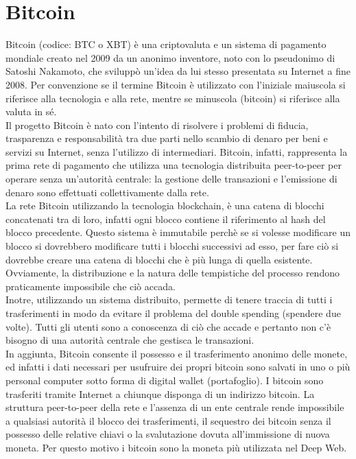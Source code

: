 \section{Bitcoin}
\label{sec:bitcoin}
Bitcoin (codice: BTC o XBT) è una criptovaluta e un sistema di pagamento mondiale creato nel 2009 da un anonimo inventore, noto con lo pseudonimo di Satoshi Nakamoto, che sviluppò un'idea da lui stesso presentata su Internet a fine 2008. Per convenzione se il termine Bitcoin è utilizzato con l'iniziale maiuscola si riferisce alla tecnologia e alla rete, mentre se minuscola (bitcoin) si riferisce alla valuta in sé.\cite{bitcoin:ECDSA}
\\Il progetto Bitcoin è nato con l'intento di risolvere i problemi di fiducia, trasparenza e responsabilità tra due parti nello scambio di denaro per beni e servizi su Internet, senza l'utilizzo di intermediari. Bitcoin, infatti, rappresenta la prima rete di pagamento che utilizza una tecnologia distribuita peer-to-peer per operare senza un'autorità centrale: la gestione delle transazioni e l'emissione di denaro sono effettuati collettivamente dalla rete.
\\La rete Bitcoin utilizzando la tecnologia blockchain, è una catena di blocchi concatenati tra di loro, infatti ogni blocco contiene il riferimento al hash del blocco precedente. Questo sistema è immutabile perchè se si volesse modificare un blocco si dovrebbero modificare tutti i blocchi successivi ad esso, per fare ciò si dovrebbe creare una catena di blocchi che è più lunga di quella esistente. Ovviamente, la distribuzione e la natura delle tempistiche del processo rendono praticamente impossibile che ciò accada.
\\Inotre, utilizzando un sistema distribuito, permette di tenere traccia di tutti i trasferimenti in modo da evitare il problema del double spending (spendere due volte). Tutti gli utenti sono a conoscenza di ciò che accade e pertanto non c’è bisogno di una autorità centrale che gestisca le transazioni.
\\In aggiunta, Bitcoin consente il possesso e il trasferimento anonimo delle monete, ed infatti i dati necessari per usufruire dei propri bitcoin sono salvati in uno o più personal computer sotto forma di digital wallet (portafoglio). I bitcoin sono trasferiti tramite Internet a chiunque disponga di un indirizzo bitcoin. La struttura peer-to-peer della rete e l'assenza di un ente centrale rende impossibile a qualsiasi autorità il blocco dei trasferimenti, il sequestro dei bitcoin senza il possesso delle relative chiavi o la svalutazione dovuta all'immissione di nuova moneta. Per questo motivo i bitcoin sono la moneta più utilizzata nel Deep Web.
